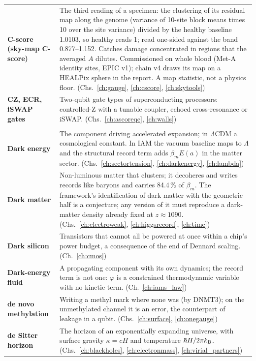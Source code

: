 {\begin{longtable}{@{}>{\raggedright\arraybackslash}p{}>{\raggedright\arraybackslash}p{}@{}}
\textbf{C-score (sky-map C-score)} & The third reading of a specimen: the clustering of its residual map along the genome (variance of 10-site block means times 10 over the site variance) divided by the healthy baseline 1.0103, so healthy reads 1; read one-sided against the band 0.877--1.152. Catches damage concentrated in regions that the averaged $A$ dilutes. Commissioned on whole blood (Met-A identity sites, EPIC v1); chain v4 draws its map on a HEALPix sphere in the report. A map statistic, not a physics floor. {\footnotesize(Chs.~\ref{ch:gauge}, \ref{ch:cscore}, \ref{ch:skytools})}\\[1pt]
\textbf{CZ, ECR, iSWAP gates} & Two-qubit gate types of superconducting processors: controlled-Z with a tunable coupler, echoed cross-resonance or iSWAP. {\footnotesize(Chs.~\ref{ch:ascoreqc}, \ref{ch:walls})}\\[1pt]
\multicolumn{2}{@{}l}{\normalsize\textbf{D}}\\[2pt]
\textbf{Dark energy} & The component driving accelerated expansion; in $\Lambda$CDM a cosmological constant. In IAM the vacuum baseline maps to $\Lambda$ and the structural record term adds $\beta_mE(a)$ in the matter sector. {\footnotesize(Chs.~\ref{ch:sectortension}, \ref{ch:darkenergy}, \ref{ch:lambda})}\\[1pt]
\textbf{Dark matter} & Non-luminous matter that clusters; it decoheres and writes records like baryons and carries 84.4\,\% of $\beta_m$. The framework's identification of dark matter with the geometric half is a conjecture; any version of it must reproduce a dark-matter density already fixed at $z\approx1090$. {\footnotesize(Chs.~\ref{ch:electroweak}, \ref{ch:higgsrecord}, \ref{ch:time})}\\[1pt]
\textbf{Dark silicon} & Transistors that cannot all be powered at once within a chip's power budget, a consequence of the end of Dennard scaling. {\footnotesize(Ch.~\ref{ch:cmos})}\\[1pt]
\textbf{Dark-energy fluid} & A propagating component with its own dynamics; the record term is not one: $\varphi$ is a constrained thermodynamic variable with no kinetic term. {\footnotesize(Ch.~\ref{ch:iams_law})}\\[1pt]
\textbf{de novo methylation} & Writing a methyl mark where none was (by DNMT3); on the unmethylated channel it is an error, the counterpart of leakage in a qubit. {\footnotesize(Chs.~\ref{ch:surface}, \ref{ch:onegauge})}\\[1pt]
\textbf{de Sitter horizon} & The horizon of an exponentially expanding universe, with surface gravity $\kappa=cH$ and temperature $\hbar H/2\pi k_{\mathrm B}$. {\footnotesize(Chs.~\ref{ch:blackholes}, \ref{ch:electronmass}, \ref{ch:virial_partners})}\\[1pt]

\end{longtable}}
